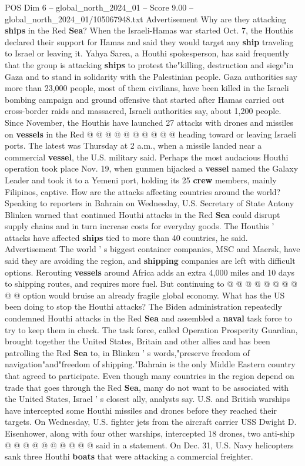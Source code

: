 \begin{textsample}{POS Dim 6 – global\_north\_2024\_01 – Score 9.00 – global\_north\_2024\_01/105067948.txt}
Advertisement Why are they attacking \textbf{ships} in the Red \textbf{Sea}?
When the Israeli-Hamas war started Oct. 7, the Houthis declared their support for Hamas and said they would target any \textbf{ship} traveling to Israel or leaving it.
Yahya Sarea, a Houthi spokesperson, has said frequently that the group is attacking \textbf{ships} to protest the"killing, destruction and siege"in Gaza and to stand in solidarity with the Palestinian people.
Gaza authorities say more than 23,000 people, most of them civilians, have been killed in the Israeli bombing campaign and ground offensive that started after Hamas carried out cross-border raids and massacred, Israeli authorities say, about 1,200 people.
Since November, the Houthis have launched 27 attacks with drones and missiles on \textbf{vessels} in the Red @ @ @ @ @ @ @ @ @ @ heading toward or leaving Israeli ports.
The latest was Thursday at 2 a.m., when a missile landed near a commercial \textbf{vessel}, the U.S. military said.
Perhaps the most audacious Houthi operation took place Nov. 19, when gunmen hijacked a \textbf{vessel} named the Galaxy Leader and took it to a Yemeni port, holding its 25 \textbf{crew} members, mainly Filipinos, captive.
How are the attacks affecting countries around the world?
Speaking to reporters in Bahrain on Wednesday, U.S.
Secretary of State Antony Blinken warned that continued Houthi attacks in the Red \textbf{Sea} could disrupt supply chains and in turn increase costs for everyday goods.
The Houthis ' attacks have affected \textbf{ships} tied to more than 40 countries, he said.
Advertisement The world ' s biggest container companies, MSC and Maersk, have said they are avoiding the region, and \textbf{shipping} companies are left with difficult options.
Rerouting \textbf{vessels} around Africa adds an extra 4,000 miles and 10 days to shipping routes, and requires more fuel.
But continuing to @ @ @ @ @ @ @ @ @ @ option would bruise an already fragile global economy.
What has the US been doing to stop the Houthi attacks?
The Biden administration repeatedly condemned Houthi attacks in the Red \textbf{Sea} and assembled a \textbf{naval} task force to try to keep them in check.
The task force, called Operation Prosperity Guardian, brought together the United States, Britain and other allies and has been patrolling the Red \textbf{Sea} to, in Blinken ' s words,"preserve freedom of navigation"and"freedom of shipping."Bahrain is the only Middle Eastern country that agreed to participate.
Even though many countries in the region depend on trade that goes through the Red \textbf{Sea}, many do not want to be associated with the United States, Israel ' s closest ally, analysts say.
U.S. and British warships have intercepted some Houthi missiles and drones before they reached their targets.
On Wednesday, U.S. fighter jets from the aircraft carrier USS Dwight D.
Eisenhower, along with four other warships, intercepted 18 drones, two anti-ship @ @ @ @ @ @ @ @ @ @ said in a statement.
On Dec. 31, U.S.
Navy helicopters sank three Houthi \textbf{boats} that were attacking a commercial freighter.

\end{textsample}
